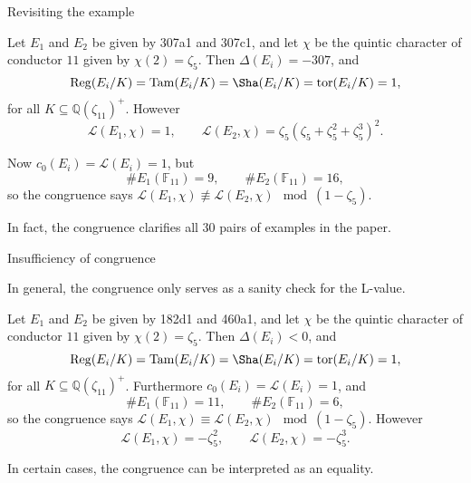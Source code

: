 \documentclass[10pt]{beamer}
\begin{document}
\begin{frame}[t]{Revisiting the example}

\begin{example}
Let $ E_1 $ and $ E_2 $ be given by 307a1 and 307c1, and let $ \chi $ be the quintic character of conductor $ 11 $ given by $ \chi(2) = \zeta_5 $. Then $ \Delta(E_i) = -307 $, and
$$ \mathrm{Reg}(E_i / K) = \mathrm{Tam}(E_i / K) = \Sha(E_i / K) = \mathrm{tor}(E_i / K) = 1, $$
for all $ K \subseteq \mathbb{Q}(\zeta_{11})^+ $. However
$$ \mathcal{L}(E_1, \chi) = 1, \qquad \mathcal{L}(E_2, \chi) = \zeta_5(\zeta_5 + \zeta_5^2 + \zeta_5^3)^2. $$

\pause

Now $ c_0(E_i) = \mathcal{L}(E_i) = 1 $, but
$$ \#E_1(\mathbb{F}_{11}) = 9, \qquad \#E_2(\mathbb{F}_{11}) = 16, $$
so the congruence says $ \mathcal{L}(E_1, \chi) \not\equiv \mathcal{L}(E_2, \chi) \mod (1 - \zeta_5) $.
\end{example}

\pause

\vspace{0.5cm} In fact, the congruence clarifies all 30 pairs of examples in the paper.

\end{frame}

\begin{frame}[t]{Insufficiency of congruence}

In general, the congruence only serves as a sanity check for the L-value.

\pause

\begin{example}
Let $ E_1 $ and $ E_2 $ be given by 182d1 and 460a1, and let $ \chi $ be the quintic character of conductor $ 11 $ given by $ \chi(2) = \zeta_5 $. \pause Then $ \Delta(E_i) < 0 $, and
$$ \mathrm{Reg}(E_i / K) = \mathrm{Tam}(E_i / K) = \Sha(E_i / K) = \mathrm{tor}(E_i / K) = 1, $$
for all $ K \subseteq \mathbb{Q}(\zeta_{11})^+ $. \pause Furthermore $ c_0(E_i) = \mathcal{L}(E_i) = 1 $, and
$$ \#E_1(\mathbb{F}_{11}) = 11, \qquad \#E_2(\mathbb{F}_{11}) = 6, $$
so the congruence says $ \mathcal{L}(E_1, \chi) \equiv \mathcal{L}(E_2, \chi) \mod (1 - \zeta_5) $. \pause However
$$ \mathcal{L}(E_1, \chi) = -\zeta_5^2, \qquad \mathcal{L}(E_2, \chi) = -\zeta_5^3. $$
\end{example}

\pause

In certain cases, the congruence can be interpreted as an equality.

\end{frame}
\end{document}

